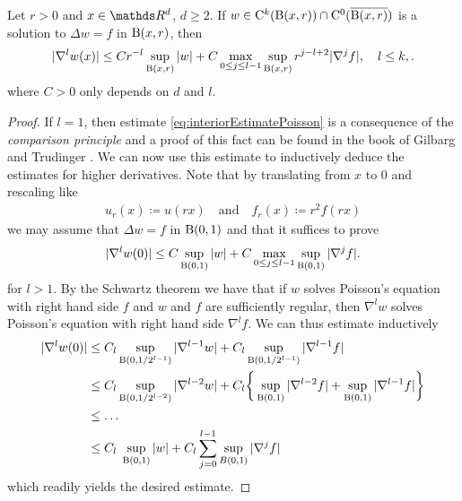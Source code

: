 \begin{lem}
  \label{lem:interiorEstimatePoisson}
  Let $r > 0$ and $x \in \R^d$, $d \geq 2$. 
  If $w \in \mathrm{C}^{k}(\mathrm{B}(x,r)) \cap \mathrm{C}^0(\overline{\mathrm{B}(x,r)})$ is a solution to $\Delta w = f$ in $\mathrm{B}(x,r)$, then
  \begin{align}
    \label{eq:interiorEstimatePoisson}
    |\nabla^l w(x)| \leq C r^{-l} \sup_{\mathrm{B}(x,r)} |w| + C \max_{0 \leq j \leq l - 1} \sup_{\mathrm{B}(x,r)} r^{j - l + 2} |\nabla^j f|, \quad l \leq k,.
  \end{align}
  where $C > 0$ only depends on $d$ and $l$.
\end{lem}

\begin{proof}
  If $l = 1$, then estimate \eqref{eq:interiorEstimatePoisson} is a consequence of the \emph{comparison principle} and a proof of this fact can be found in the book of Gilbarg and Trudinger \cite[Sec. 3.4, Eq. (3.16)]{gilbarg}.
  We can now use this estimate to inductively deduce the estimates for higher derivatives.
  Note that by translating from $x$ to $0$ and rescaling like
  \begin{align*}
    u_r(x) \coloneqq u(rx) \quad\text{and}\quad f_r(x) \coloneqq r^2 f(rx)
  \end{align*}
  we may assume that $\Delta w = f$ in $\mathrm{B}(0,1)$ and that it suffices to prove
  \begin{align}
    \label{eq:interiorEstimatePoissonSimple}
    |\nabla^l w(0) | \leq C \sup_{\mathrm{B}(0,1)} |w| + C \max_{0 \leq j \leq l - 1} \sup_{\mathrm{B}(0,1)} |\nabla^j f|.
  \end{align}
  for $l > 1$.
  By the Schwartz theorem we have that if $w$ solves Poisson's equation with right hand side $f$ and $w$ and $f$ are sufficiently regular, then $\nabla^l w$ solves Poisson's equation with right hand side $\nabla^l f$.
  We can thus estimate inductively
  \begin{align*}
    |\nabla^l w(0)|
    &\leq C_l \sup_{\mathrm{B}(0,1/2^{l - 1})} |\nabla^{l - 1} w| + C_l \sup_{\mathrm{B}(0,1/2^{l-1})} |\nabla^{l - 1} f| \\
    &\leq C_l \sup_{\mathrm{B}(0,1/2^{l-2})} |\nabla^{l - 2} w| + C_l \bigg\{ \sup_{\mathrm{B}(0,1)} |\nabla^{l - 2} f| + \sup_{\mathrm{B}(0,1)} |\nabla^{l - 1} f| \bigg\} \\
    &\leq \dots \\
    &\leq C_l \; \sup_{\mathrm{B}(0,1)} |w| + C_l \sum_{j = 0}^{l - 1} \sup_{B(0,1)} |\nabla^j f|
  \end{align*}
  which readily yields the desired estimate.
\end{proof}

